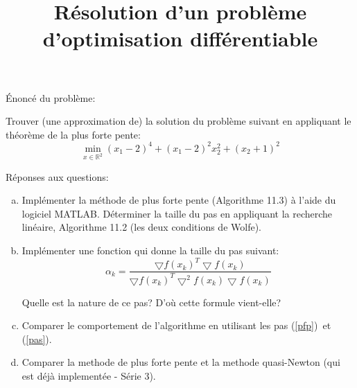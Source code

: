 \documentclass[11pt,a4paper,twoside,onecolumn,titlepage]{report}
\title{Résolution d'un problème d'optimisation différentiable}
\begin{document}
\maketitle
Énoncé du problème:

Trouver (une approximation de) la solution du problème suivant en appliquant le théorème de la plus forte pente:
\begin{equation}
\min_{x\in\mathbb{R}^2} (x_1-2)^4 + (x_1-2)^2x_2^2 + (x_2+1)^2
\end{equation}

Réponses aux questions:

\begin{enumerate}[(a)]
\item\label{pfp} Implémenter la méthode de plus forte pente (Algorithme 11.3) à l'aide du logiciel MATLAB. Déterminer la taille du pas en appliquant la recherche linéaire, Algorithme 11.2 (les deux conditions de Wolfe).

\item\label{pas} Implémenter une fonction qui donne la taille du pas suivant:
\begin{equation}
\alpha_k = \frac{\bigtriangledown f(x_k)^T \bigtriangledown f(x_k)}{\bigtriangledown f(x_k)^T \bigtriangledown^2 f(x_k) \bigtriangledown f(x_k)}
\end{equation}

Quelle est la nature de ce pas? D'où cette formule vient-elle?

\item Comparer le comportement de l'algorithme en utilisant les pas (\ref{pfp})\ et (\ref{pas}).

\item Comparer la methode de plus forte pente et la methode quasi-Newton (qui est déjà implementée - Série 3).
\end{enumerate}
\end{document}
